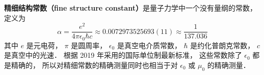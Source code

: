 

\textbf{精细结构常数（fine structure constant）}是量子力学中一个没有量纲的常数， 定义为
\begin{equation}\label{FinStr_eq1}
\alpha = \frac{e^2}{4\pi\epsilon_0\hbar c} \approx 0.0072973525693(11) \approx \frac{1}{137.036}
\end{equation}
其中 $e$ 是元电荷， $\pi$ 是圆周率， $\epsilon_0$ 是真空电介质常数， $\hbar$ 是约化普朗克常数， $c$ 是真空中的光速． 根据 2019 年采用的国际单位制最新标准， 这些常数除了 $\epsilon_0$ 都是精确的， 所以对精细常数的精确测量同时也相当于对 $\epsilon_0$ 或 $\mu_0$ 的精确测量．
